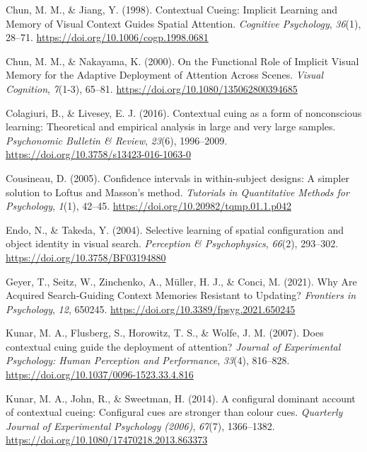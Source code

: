 \documentclass[
  man,floatsintext]{apa7}
\newlength{\cslhangindent}
\newlength{\cslentryspacingunit} %
\newenvironment{CSLReferences}[2] %
 {%
  \setlength{\parindent}{0pt}
  \ifodd #1
  \let\oldpar\par
  \def\par{\hangindent=\cslhangindent\oldpar}
  \fi
  \setlength{\parskip}{#2\cslentryspacingunit}
 }%
 {}
\begin{document}
\begin{CSLReferences}{1}{0}
\leavevmode{}%
Chun, M. M., \& Jiang, Y. (1998). Contextual {Cueing}: {Implicit Learning} and {Memory} of {Visual Context Guides Spatial Attention}. \emph{Cognitive Psychology}, \emph{36}(1), 28--71. \url{https://doi.org/10.1006/cogp.1998.0681}

\leavevmode{}%
Chun, M. M., \& Nakayama, K. (2000). On the {Functional Role} of {Implicit Visual Memory} for the {Adaptive Deployment} of {Attention Across Scenes}. \emph{Visual Cognition}, \emph{7}(1-3), 65--81. \url{https://doi.org/10.1080/135062800394685}

\leavevmode{}%
Colagiuri, B., \& Livesey, E. J. (2016). Contextual cuing as a form of nonconscious learning: {Theoretical} and empirical analysis in large and very large samples. \emph{Psychonomic Bulletin \& Review}, \emph{23}(6), 1996--2009. \url{https://doi.org/10.3758/s13423-016-1063-0}

\leavevmode{}%
Cousineau, D. (2005). Confidence intervals in within-subject designs: {A} simpler solution to {Loftus} and {Masson}'s method. \emph{Tutorials in Quantitative Methods for Psychology}, \emph{1}(1), 42--45. \url{https://doi.org/10.20982/tqmp.01.1.p042}

\leavevmode{}%
Endo, N., \& Takeda, Y. (2004). Selective learning of spatial configuration and object identity in visual search. \emph{Perception \& Psychophysics}, \emph{66}(2), 293--302. \url{https://doi.org/10.3758/BF03194880}

\leavevmode{}%
Geyer, T., Seitz, W., Zinchenko, A., Müller, H. J., \& Conci, M. (2021). Why {Are Acquired Search-Guiding Context Memories Resistant} to {Updating}? \emph{Frontiers in Psychology}, \emph{12}, 650245. \url{https://doi.org/10.3389/fpsyg.2021.650245}

\leavevmode{}%
Kunar, M. A., Flusberg, S., Horowitz, T. S., \& Wolfe, J. M. (2007). Does contextual cuing guide the deployment of attention? \emph{Journal of Experimental Psychology: Human Perception and Performance}, \emph{33}(4), 816--828. \url{https://doi.org/10.1037/0096-1523.33.4.816}

\leavevmode{}%
Kunar, M. A., John, R., \& Sweetman, H. (2014). A configural dominant account of contextual cueing: {Configural} cues are stronger than colour cues. \emph{Quarterly Journal of Experimental Psychology (2006)}, \emph{67}(7), 1366--1382. \url{https://doi.org/10.1080/17470218.2013.863373}


\end{CSLReferences}
\end{document}
